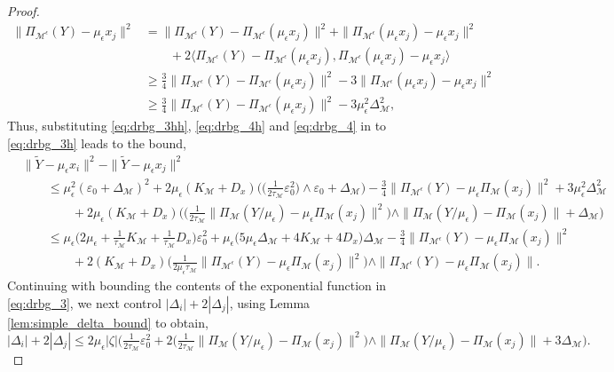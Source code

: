 \documentclass[10pt,a4paper]{amsart}
\newcommand{\M}{{\mathcal{M}}}
\newcommand{\Pieps}{\Pi_{\M^\epsilon}}
\newcommand{\gap}{\Delta_\M}
\begin{document}
\begin{proof}
\begin{align}
    \|\Pieps(Y) - \mu_\epsilon x_j\|^2 &= \|\Pieps(Y) - \Pieps(\mu_\epsilon x_j)\|^2 + \|\Pieps(\mu_\epsilon x_j) - \mu_\epsilon x_j\|^2 \nonumber\\
    & \qquad + 2 \langle \Pieps(Y) - \Pieps(\mu_\epsilon x_j), \Pieps(\mu_\epsilon x_j) - \mu_\epsilon x_j \rangle \nonumber\\
    &\geq \frac{3}{4}\|\Pieps(Y) - \Pieps(\mu_\epsilon x_j)\|^2 - 3 \|\Pieps(\mu_\epsilon x_j) - \mu_\epsilon x_j\|^2 \nonumber\\
    &\geq \frac{3}{4}\|\Pieps(Y) - \Pieps(\mu_\epsilon x_j)\|^2 - 3 \mu_\epsilon^2 \gap^2,\label{eq:drbg_4}
\end{align}
Thus, substituting \eqref{eq:drbg_3hh}, \eqref{eq:drbg_4h} and \eqref{eq:drbg_4} in to \eqref{eq:drbg_3h} leads to the bound,
\begin{align}
    &\|\tilde{Y} - \mu_\epsilon x_i\|^2-\|\tilde{Y} - \mu_\epsilon x_j\|^2 \nonumber\\
    & \qquad \leq \mu_\epsilon^2 (\varepsilon_0 + \gap)^2 + 2\mu_\epsilon (K_\M + D_x) \Big ( \big ( \tfrac{1}{2\tau_\M} \varepsilon_0^2 \big ) \wedge \varepsilon_0 + \gap \Big ) - \frac{3}{4} \|\Pieps(Y) - \mu_\epsilon \Pi_\M(x_j)\|^2 + 3 \mu_\epsilon^2 \gap^2 \nonumber\\
    & \qquad \qquad + 2 \mu_\epsilon (K_\M + D_x) \Big ( \big ( \tfrac{1}{2\tau_\M}\|\Pi_\M(Y/\mu_\epsilon) - \mu_\epsilon \Pi_\M(x_j)\|^2 \big ) \wedge \|\Pi_\M(Y/\mu_\epsilon) - \Pi_\M(x_j)\| + \gap \Big ) \nonumber\\
    & \qquad \leq \mu_\epsilon \Big ( 2 \mu_\epsilon + \tfrac{1}{\tau_\M} K_\M + \tfrac{1}{\tau_\M} D_x \Big ) \varepsilon_0^2 + \mu_\epsilon \Big ( 5 \mu_\epsilon \gap + 4 K_\M + 4 D_x \Big ) \gap - \tfrac{3}{4} \|\Pieps(Y) - \mu_\epsilon \Pi_\M(x_j)\|^2 \nonumber \\
    & \qquad \qquad + 2 ( K_\M + D_x) \big ( \tfrac{1}{2 \mu_\epsilon \tau_\M}\|\Pieps(Y) - \mu_\epsilon \Pi_\M(x_j)\|^2 \big ) \wedge \|\Pieps(Y) - \mu_\epsilon \Pi_\M(x_j)\|. \label{eq:drbg_44}
\end{align}
Continuing with bounding the contents of the exponential function in \eqref{eq:drbg_3}, we next control \(|\Delta_i| + 2 |\Delta_j|\), using Lemma \ref{lem:simple_delta_bound} to obtain,
\begin{equation}
    |\Delta_i| + 2 |\Delta_j| \leq 2 \mu_\epsilon |\zeta| \Big ( \tfrac{1}{2\tau_\M} \varepsilon_0^2 + 2 \big ( \tfrac{1}{2\tau_\M} \|\Pi_\M(Y/\mu_\epsilon) - \Pi_\M(x_j) \|^2 \big ) \wedge \|\Pi_\M(Y/\mu_\epsilon) - \Pi_\M(x_j) \|  + 3 \gap \Big ).\label{eq:drbg_5}

\end{equation}
\end{proof}
\end{document}
